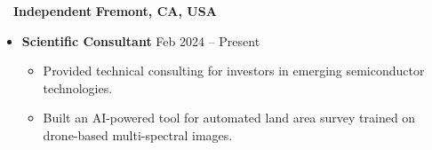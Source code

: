 ~~{\color{black}\textbf{Independent} \hfill  \textbf{Fremont, CA, USA}}\par
\begin{itemize}
    \item
        \textbf{Scientific Consultant}
        \hfill  {Feb 2024 -- Present} \par
        \begin{itemize}
            \item Provided technical consulting for investors in emerging semiconductor technologies. 
            \item Built an AI-powered tool for automated land area survey trained on drone-based multi-spectral images. 
        \end{itemize}
\end{itemize}